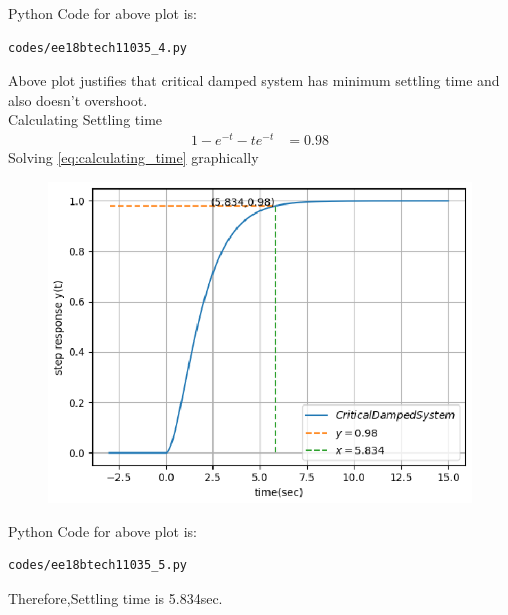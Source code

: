\begin{enumerate}[label=\thesubsection.\arabic*.,ref=\thesubsection.\theenumi]
Python Code for above plot is:
\begin{lstlisting}
codes/ee18btech11035_4.py
\end{lstlisting}
Above plot justifies that critical damped system  has minimum settling time and also doesn't overshoot.\\
Calculating Settling time\\
\begin{align}
    \label{eq:calculating_time}
    1-e^{-t}-te^{-t}&=0.98
\end{align}
Solving \eqref{eq:calculating_time} graphically\\
\begin{figure}[!h]
\includegraphics[width=\columnwidth]{./figures/ee18btech11035_5.eps}
\caption{}
\label{fig:ee18btech11035_settling}
\end{figure}

Python Code for above plot is:
\begin{lstlisting}
codes/ee18btech11035_5.py
\end{lstlisting}
Therefore,Settling time is 5.834sec.
\end{enumerate}
